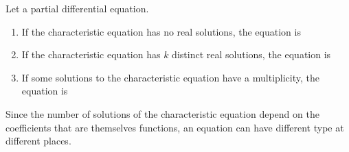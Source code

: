\begin{definition}
    Let a partial differential equation.
    \begin{enumerate}
        \item
            If the characteristic equation has no real solutions, the equation is 
        \item
            If the characteristic equation has \( k\) distinct real solutions, the equation is 
        \item
            If some solutions to the characteristic equation have a multiplicity, the equation is 
    \end{enumerate}
\end{definition}

Since the number of solutions of the characteristic equation depend on the coefficients that are themselves functions, an equation can have different type at different places.


